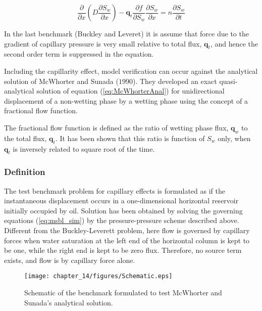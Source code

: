 \begin{equation}
\frac{\partial }{\partial x}\left( D\frac{\partial S_w}{\partial x}\right) - \mathbf q_t \frac{\partial f}{\partial S_w}\frac{\partial S_w}{\partial x}=n \frac{\partial S_w}{\partial t}
\label{eq:McWhorterAnal}
\end{equation}

In the last benchmark (Buckley and Leveret) it is assume that force due to the gradient of capillary pressure is very small relative to total flux, $\mathbf q_t$, and hence the second order term is suppressed in the equation.

Including the capillarity effect, model verification can occur against the analytical solution of McWhorter and Sunada ($1990$). They developed an exact quasi-analytical solution of equation (\ref{eq:McWhorterAnal}) for unidirectional displacement of a non-wetting phase by a wetting phase using the concept of a fractional flow function.

The fractional flow function is defined as the ratio of wetting phase flux, $\mathbf q_w$ to the total flux, $\mathbf q_t$. It has been shown that this ratio is function of $S_w$ only, when $\mathbf q_t$ is inversely related to square root of the time.

\subsubsection*{Definition}
The test benchmark problem for capillary effects is formulated as if the instantaneous displacement occurs in a one-dimensional horizontal reservoir initially occupied by oil. Solution has been obtained by solving the governing equations (\ref{eq:msbl_sim}) by the pressure-pressure scheme described above. Different from the Buckley-Leverett problem, here flow is governed by capillary forces when water saturation at the left end of the horizontal column is kept to be one, while the right end is kept to be zero flux. Therefore, no source term exists, and flow is by capillary force alone.

\vspace{-0.3cm}
\begin{figure}[H]
\begin{center}
\texttt{[image: chapter\_14/figures/Schematic.eps]}
\end{center}
\vspace{-0.6cm}
\caption{Schematic of the benchmark formulated to test McWhorter and Sunada's analytical solution.}
\label{mcwt:config}
\end{figure}
\vspace{-0.4cm}

